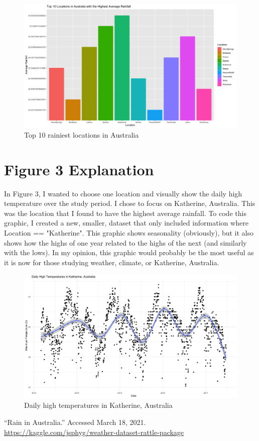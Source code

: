 \documentclass{article}
\begin{document}
\begin{figure} [h!]
\centering
\includegraphics[scale=0.275]{PS6b_Nadolski.png}
\caption{Top 10 rainiest locations in Australia}
\label{fig:b}
\end{figure}




\section{Figure 3 Explanation}
In Figure 3, I wanted to choose one location and visually show the daily high temperature over the study period. I chose to focus on Katherine, Australia. This was the location that I found to have the highest average rainfall. To code this graphic, I created a new, smaller, dataset that only included information where Location == "Katherine". This graphic shows seasonality (obviously), but it also shows how the highs of one year related to the highs of the next (and similarly with the lows). In my opinion, this graphic would probably be the most useful as it is now for those studying weather, climate, or Katherine, Australia. 

\begin{figure} [!h]
    \centering
    \includegraphics[scale=0.275]{PS6c_Nadolski.png}
    \caption{Daily high temperatures in Katherine, Australia}
    \label{fig:c}
\end{figure}




“Rain in Australia.” Accessed March 18, 2021. \url{https://kaggle.com/jsphyg/weather-dataset-rattle-package}
\end{document}

